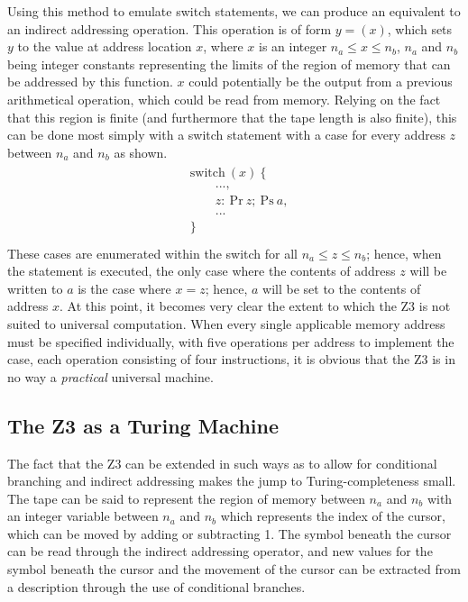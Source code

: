 \documentclass[Master.tex]{subfiles}
\begin{document}
Using this method to emulate switch statements, we can produce an equivalent to an indirect addressing operation. This operation is of form $y = (x)$, which sets $y$ to the value at address location $x$, where $x$ is an integer $n_a \leq x \leq n_b$, $n_a$ and $n_b$ being integer constants representing the limits of the region of memory that can be addressed by this function. $x$ could potentially be the output from a previous arithmetical operation, which could be read from memory. Relying on the fact that this region is finite (and furthermore that the tape length is also finite), this can be done most simply with a switch statement with a case for every address $z$ between $n_a$ and $n_b$ as shown.
\begin{gather*}
\begin{aligned}
&\bm{\mathrm{switch}}\ (x)\ \{              	\\
&\qquad ... ,                                   \\
&\qquad z:\	\mathrm{Pr}\ z;\ \mathrm{Ps}\ a,    \\
&\qquad ... 					                \\
&\}							                    \\
\end{aligned}
\end{gather*}
These cases are enumerated within the switch for all $n_a \leq z \leq n_b$; hence, when the statement is executed, the only case where the contents of address $z$ will be written to $a$ is the case where $x=z$; hence, $a$ will be set to the contents of address $x$.
At this point, it becomes very clear the extent to which the Z3 is not suited to universal computation. When every single applicable memory address must be specified individually, with five operations per address to implement the case, each operation consisting of four instructions, it is obvious that the Z3 is in no way a \textit{practical} universal machine.
\subsection{The Z3 as a Turing Machine}

The fact that the Z3 can be extended in such ways as to allow for conditional branching and indirect addressing makes the jump to Turing-completeness small. The tape can be said to represent the region of memory between $n_a$ and $n_b$ with an integer variable between $n_a$ and $n_b$ which represents the index of the cursor, which can be moved by adding or subtracting 1. The symbol beneath the cursor can be read through the indirect addressing operator, and new values for the symbol beneath the cursor and the movement of the cursor can be extracted from a description through the use of conditional branches.
\end{document}
